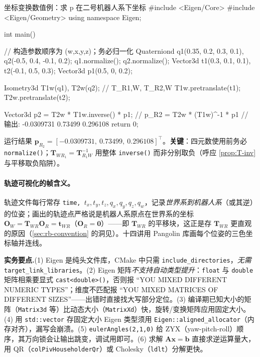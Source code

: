 \begin{codebox}[C++]{坐标变换数值例：求 p 在二号机器人系下坐标}
#include <Eigen/Core>
#include <Eigen/Geometry>
using namespace Eigen;

int main() {
    // 构造参数顺序为 (w,x,y,z)；务必归一化
    Quaterniond q1(0.35, 0.2, 0.3, 0.1), q2(-0.5, 0.4, -0.1, 0.2);
    q1.normalize();
    q2.normalize();
    Vector3d t1(0.3, 0.1, 0.1), t2(-0.1, 0.5, 0.3);
    Vector3d p1(0.5, 0, 0.2);

    Isometry3d T1w(q1), T2w(q2);   // T_{R1,W}, T_{R2,W}
    T1w.pretranslate(t1);
    T2w.pretranslate(t2);

    Vector3d p2 = T2w * T1w.inverse() * p1;   // p_{R2} = T2w * (T1w)^-1 * p1
    // 输出: -0.0309731  0.73499  0.296108
    return 0;
}
\end{codebox}
\noindent 运行结果 $\mathbf{p}_{R_2}=[-0.0309731,\ 0.73499,\ 0.296108]^\top$。\textbf{关键}：四元数使用前务必 \texttt{normalize()}；$\mathbf{T}_{WR_1}=\mathbf{T}_{R_1W}^{-1}$ 用整体 \texttt{inverse()} 而非分别取负（呼应 \cref{prop:T-inv} 与平移取负陷阱）。

\paragraph{轨迹可视化的帧含义。}轨迹文件每行常存 \texttt{time, $t_x,t_y,t_z,q_x,q_y,q_z,q_w$}，记录\emph{世界系到机器人系}（或其逆）的位姿；画出的轨迹点严格说是机器人系原点在世界系的坐标 $\mathbf{O}_W=\mathbf{T}_{WR}\mathbf{O}_R=\mathbf{t}_{WR}$（$\mathbf{O}_R=\mathbf{0}$）——即 $\mathbf{T}_{WR}$ 的平移块，这正是存 $\mathbf{T}_{WR}$ 更直观的原因（\cref{sec:rb-convention} 的洞见）。十四讲用 Pangolin 库画每个位姿的三色坐标轴并连线\cite{gaoxiang2019slam14}。

\begin{note}
\textbf{实务要点.}\;(1) Eigen 是纯头文件库，CMake 中只需 \texttt{include\_directories}，\emph{无需} \texttt{target\_link\_libraries}。(2) Eigen 矩阵\emph{不支持自动类型提升}：\texttt{float} 与 \texttt{double} 矩阵相乘要显式 \texttt{cast<double>()}，否则报 “YOU MIXED DIFFERENT NUMERIC TYPES”；维度不匹配报 “YOU MIXED MATRICES OF DIFFERENT SIZES”——出错时直接找大写部分定位。(3) 编译期已知大小的矩阵（\texttt{Matrix3d} 等）比动态大小（\texttt{MatrixXd}）快，旋转/变换矩阵应用固定大小。(4) 用 \texttt{std::vector} 存固定大小 Eigen 类型须用 \texttt{Eigen::aligned\_allocator}（内存对齐），漏写会崩溃。(5) \texttt{eulerAngles(2,1,0)} 给 ZYX（yaw-pitch-roll）顺序，其万向锁会让输出跳变，调试用即可。(6) 求解 $\mathbf{A}\mathbf{x}=\mathbf{b}$ 直接求逆运算量大，用 QR（\texttt{colPivHouseholderQr}）或 Cholesky（\texttt{ldlt}）分解更快。
\end{note}

